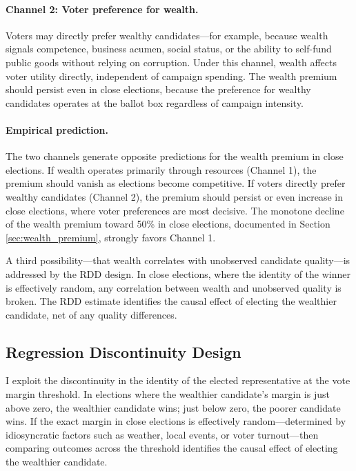 \documentclass[12pt]{article}
\begin{document}
\paragraph{Channel 2: Voter preference for wealth.} Voters may directly prefer wealthy candidates---for example, because wealth signals competence, business acumen, social status, or the ability to self-fund public goods without relying on corruption. Under this channel, wealth affects voter utility directly, independent of campaign spending. The wealth premium should persist even in close elections, because the preference for wealthy candidates operates at the ballot box regardless of campaign intensity.

\paragraph{Empirical prediction.} The two channels generate opposite predictions for the wealth premium in close elections. If wealth operates primarily through resources (Channel 1), the premium should vanish as elections become competitive. If voters directly prefer wealthy candidates (Channel 2), the premium should persist or even increase in close elections, where voter preferences are most decisive. The monotone decline of the wealth premium toward 50\% in close elections, documented in Section \ref{sec:wealth_premium}, strongly favors Channel 1.

A third possibility---that wealth correlates with unobserved candidate quality---is addressed by the RDD design. In close elections, where the identity of the winner is effectively random, any correlation between wealth and unobserved quality is broken. The RDD estimate identifies the causal effect of electing the wealthier candidate, net of any quality differences.

\subsection{Regression Discontinuity Design}

I exploit the discontinuity in the identity of the elected representative at the vote margin threshold. In elections where the wealthier candidate's margin is just above zero, the wealthier candidate wins; just below zero, the poorer candidate wins. If the exact margin in close elections is effectively random---determined by idiosyncratic factors such as weather, local events, or voter turnout---then comparing outcomes across the threshold identifies the causal effect of electing the wealthier candidate.
\end{document}
